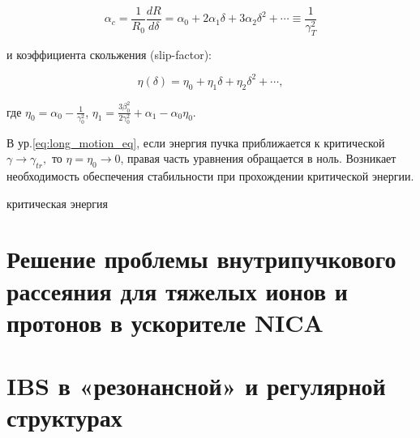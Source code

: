 \begin{equation}
\alpha_c=\frac{1}{R_0} \frac{d R}{d \delta}=\alpha_0+2 \alpha_1 \delta+3 \alpha_2 \delta^2+\cdots \equiv \frac{1}{\gamma_T^2}
\label{eq:alpha}
\end{equation}

и коэффициента скольжения (slip-factor):

\begin{equation}
\eta(\delta)=\eta_0+\eta_1 \delta+\eta_2 \delta^2+\cdots,
\label{eq:eta}
\end{equation}

\noindent где $\eta_0=\alpha_0-\frac{1}{\gamma_0^2}$, $\eta_1=\frac{3\beta_0^2}{2\gamma_0^2}+\alpha_1-\alpha_0\eta_0$.

\par В ур.\ref{eq:long_motion_eq}, если энергия пучка приближается к критической $\gamma\rightarrow\gamma_{tr},$  то $\eta=\eta_0\rightarrow0$, правая часть уравнения обращается в ноль. Возникает необходимость обеспечения стабильности при прохождении критической энергии.

\par критическая энергия 

\section{Решение проблемы внутрипучкового рассеяния для тяжелых ионов и протонов в ускорителе NICA }\label{sec:ions_light/IBS}

\section{IBS в «резонансной» и регулярной структурах}\label{sec:ions_light/IBS_res_reg}

\FloatBarrier
